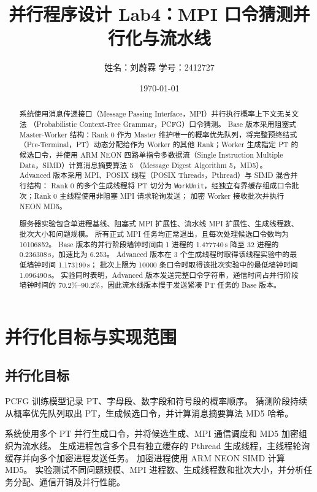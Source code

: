 \documentclass[UTF8,a4paper,12pt]{ctexart}
\title{并行程序设计 Lab4：MPI 口令猜测并行化与流水线}
\author{姓名：刘蔚霖 \quad 学号：2412727}
\date{\today}
\newcommand{\code}[1]{\texttt{#1}}
\newcommand{\seconds}[1]{#1\,s}
\begin{document}
\maketitle

\begin{abstract}
系统使用消息传递接口（Message Passing Interface，MPI）并行执行概率上下文无关文法
（Probabilistic Context-Free Grammar，PCFG）口令猜测。
Base 版本采用阻塞式 Master-Worker 结构：Rank 0 作为 Master 维护唯一的概率优先队列，将完整预终结式
（Pre-Terminal，PT）动态分配给作为 Worker 的其他 Rank；Worker 生成指定 PT 的候选口令，并使用
ARM NEON 四路单指令多数据流（Single Instruction Multiple Data，SIMD）计算消息摘要算法 5
（Message Digest Algorithm 5，MD5）。
Advanced 版本采用 MPI、POSIX 线程（POSIX Threads，Pthread）与 SIMD 混合并行结构：
Rank 0 的多个生成线程将 PT 切分为
\code{WorkUnit}，经独立有界缓存组成口令批次；Rank 0 主线程使用非阻塞 MPI 请求轮询发送；
加密 Worker 接收批次并执行 NEON MD5。

服务器实验包含单进程基线、阻塞式 MPI 扩展性、流水线 MPI 扩展性、生成线程数、批次大小和问题规模。
所有正式 MPI 任务均正常退出，且每次处理候选口令数均为 10106852。
Base 版本的并行阶段墙钟时间由 1 进程的 \seconds{1.477740} 降至 32 进程的
\seconds{0.236308}，加速比为 6.253。
Advanced 版本在 3 个生成线程时取得该线程实验中的最低墙钟时间 \seconds{1.173190}；
批次上限为 10000 条口令时取得该批次实验中的最低墙钟时间 \seconds{1.096490}。
实验同时表明，Advanced 版本发送完整口令字符串，通信时间占并行阶段墙钟时间的
70.2\%--90.2\%，因此流水线版本慢于发送紧凑 PT 任务的 Base 版本。
\end{abstract}

\tableofcontents
\newpage

\section{并行化目标与实现范围}

\subsection{并行化目标}

PCFG 训练模型记录 PT、字母段、数字段和符号段的概率顺序。
猜测阶段持续从概率优先队列取出 PT，生成候选口令，并计算消息摘要算法 MD5
哈希。

系统使用多个 PT 并行生成口令，并将候选生成、MPI 通信调度和 MD5 加密组织为流水线。
生成进程包含多个具有独立缓存的 Pthread 生成线程，主线程轮询缓存并向多个加密进程发送任务。
加密进程使用 ARM NEON SIMD 计算 MD5。
实验测试不同问题规模、MPI 进程数、生成线程数和批次大小，并分析任务分配、通信开销及并行性能。
\end{document}
